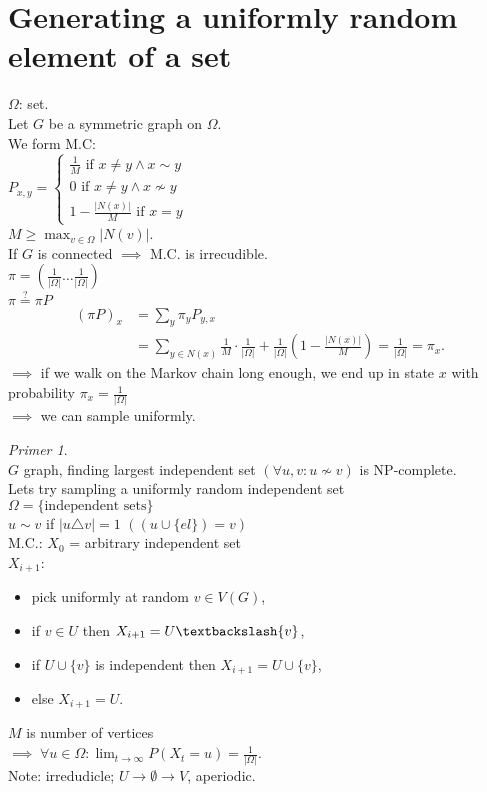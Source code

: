 \documentclass[a4paper, 12pt]{book}
\theoremstyle{definition}
\theoremstyle{remark}
\newtheorem*{ex}{Primer}
\begin{document}
\section{Generating a uniformly random element of a set}

$\Omega$: set. \\
Let $G$ be a symmetric graph on $\Omega$. \\
We form M.C: \\
$P_{x,y} = \begin{cases}
  \frac{1}{M} \text{ if } x \neq y \land x \sim y \\
  0 \text{ if } x \neq y \land x \nsim y \\
  1 - \frac{|N(x)|}{M} \text{ if } x = y
\end{cases}$ \\
$M \geq \max_{v \in \Omega} |N(v)|$. \\
If $G$ is connected $\implies$ M.C. is irrecudible. \\
$\pi = (\frac{1}{|\Omega|} \dots \frac{1}{|\Omega|})$ \\
$\pi \stackrel{?}{=} \pi P$ \\
\begin{align*}
  (\pi P)_x &= \sum_y \pi_y P_{y,x} \\
  &= \sum_{y \in N(x)} \frac{1}{M} \cdot \frac{1}{|\Omega|} + \frac{1}{|\Omega|}
    \left(1 - \frac{|N(x)|}{M}\right) = \frac{1}{|\Omega|} = \pi_x.
\end{align*}
$\implies$ if we walk on the Markov chain long enough, we end up in state $x$ with probability $\pi_x = \frac{1}{|\Omega|}$ \\
$\implies$ we can sample uniformly.
\begin{ex} \text{} \\
  $G$ graph, finding largest independent set $(\forall u,v: u \nsim v)$ is NP-complete. \\
  Lets try sampling a uniformly random independent set \\
  $\Omega = \{\text{independent sets}\}$ \\
  $u \sim v$ if $|u \triangle v| = 1$ $((u \cup \{el\}) = v)$ \\
  M.C.: $X_0$ = arbitrary independent set \\
  $X_{i+1}$:
  \begin{itemize}
    \item pick uniformly at random $v \in V(G)$,
    \item if $v \in U$ then $X_{i+1} = U \textbackslash \{v\}$,
    \item if $U \cup \{v\}$ is independent then $X_{i+1} = U \cup \{v\}$,
    \item else $X_{i+1} = U$.
  \end{itemize}
  $M$ is number of vertices \\
  $\implies \; \forall u \in \Omega: \lim_{t \to \infty} P(X_t = u) = \frac{1}{|\Omega|}$. \\
  Note: irredudicle; $U \to \emptyset \to V$, aperiodic.
\end{ex}
\end{document}
